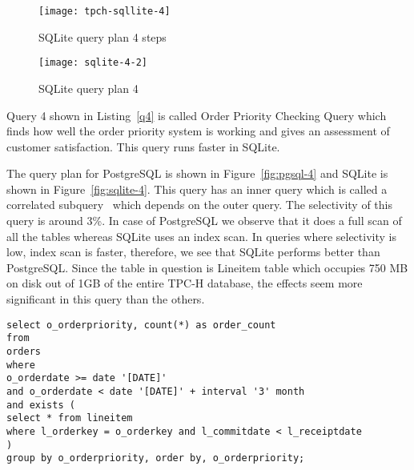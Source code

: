 
\begin{figure*}[ht]
\centering
     \begin{subfigure}[b]{0.4\textwidth}
         \centering
         \texttt{[image: tpch-sqllite-4]}
         \caption{SQLite query plan 4 steps}
         \label{fig:tpch-sqllite-4}
     \end{subfigure}
     \hfill
     \begin{subfigure}[b]{0.4\textwidth}
         \centering
         \texttt{[image: sqlite-4-2]}
         \caption{SQLite query plan 4}
         \label{fig:sqlite-4-2}
     \end{subfigure}

        \caption{SQLite plan for query 4}
        \label{fig:sqlite-4}
\end{figure*}
Query 4 shown in Listing~\ref{q4} is called Order Priority Checking Query which finds how well the order priority system is working and gives an assessment of customer satisfaction. This query runs faster in SQLite.

The query plan for PostgreSQL is shown in Figure~\ref{fig:pgsql-4} and SQLite is shown in Figure~\ref{fig:sqlite-4}. This query has an inner query which is called a correlated subquery~\cite{ref:sqlite1} which depends on the outer query. The selectivity of this query is around 3\%. In case of PostgreSQL we observe that it does a full scan of all the tables whereas SQLite uses an index scan. In queries where selectivity is low, index scan is faster, therefore, we see that SQLite performs better than PostgreSQL. Since the table in question is Lineitem table which occupies 750 MB on disk out of 1GB of the entire TPC-H database, the effects seem more significant in this query than the others.

\begin{minipage}{\linewidth}
\begin{lstlisting}[breaklines=true, numbers=none, label=q4, caption=Query 4]
select o_orderpriority, count(*) as order_count
from
orders
where
o_orderdate >= date '[DATE]'
and o_orderdate < date '[DATE]' + interval '3' month
and exists (
select * from lineitem
where l_orderkey = o_orderkey and l_commitdate < l_receiptdate
)
group by o_orderpriority, order by, o_orderpriority;
\end{lstlisting}
\end{minipage}






